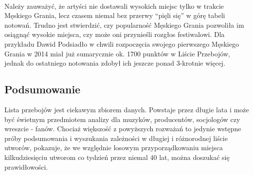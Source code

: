 \documentclass[11pt]{article}
\begin{document}
    \begin{center}
    \end{center}
    { \hspace*{\fill} \\}
    
    Należy zauważyć, że artyści nie dostawali wysokich miejsc tylko w
trakcie Męskiego Grania, lecz czasem niemal bez przerwy ``pięli się'' w
górę tabeli notowań. Trudno jest stwierdzić, czy popularność Męskiego
Grania pozwoliła im osiągnąć wysokie miejsca, czy może oni przynieśli
rozgłos festiwalowi. Dla przykładu Dawid Podsiadło w chwili rozpoczęcia
swojego pierwszego Męskiego Grania w 2014 miał już sumarycznie ok. 1700
punktów w Liście Przebojów, jednak do ostatniego notowania zdobył ich
jeszcze ponad 3-krotnie więcej.

    \hypertarget{podsumowanie}{%
\subsection{Podsumowanie}\label{podsumowanie}}

Lista przebojów jest ciekawym zbiorem danych. Powstaje przez długie lata
i może być świetnym przedmiotem analizy dla muzyków, producentów,
socjologów czy wreszcie - fanów. Chociaż większość z powyższych rozważań
to jedynie wstępne próby podsumowania i wyszukania zależności w długiej
i różnorodnej liście utworów, pokazuje, że we względnie losowym
przyporządkowaniu miejsca kilkudziesięciu utworom co tydzień przez
niemal 40 lat, można doszukać się prawidłowości.


    
    
    
\end{document}
